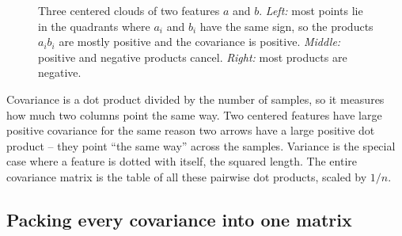 \begin{figure}[htbp]
\centering
{}
\caption{Three centered clouds of two features $a$ and $b$. \emph{Left:} most points
lie in the quadrants where $a_i$ and $b_i$ have the same sign, so the products $a_ib_i$
are mostly positive and the covariance is positive. \emph{Middle:} positive and
negative products cancel. \emph{Right:} most products are negative.}
\label{ch30:cov-signs}
\end{figure}

\begin{intuitionbox}
Covariance is a dot product divided by the number of samples, so it measures how
much two columns point the same way.
Two centered features have large positive covariance for the same
reason two arrows have a large positive dot product -- they point ``the same way''
across the samples. Variance is the special case where a feature is dotted with
itself, the squared length. The entire covariance matrix is the table of all these
pairwise dot products, scaled by $1/n$.
\end{intuitionbox}

\subsection{Packing every covariance into one matrix}

